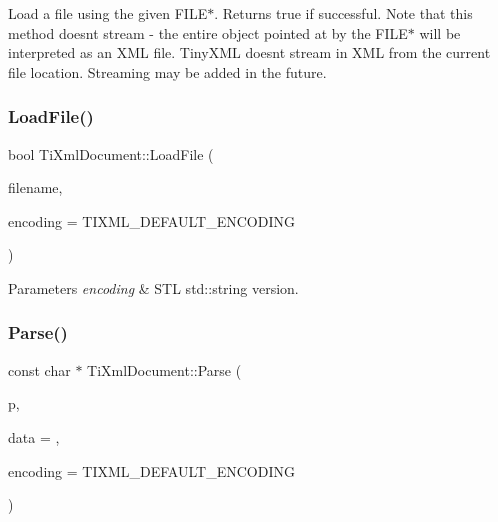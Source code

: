 Load a file using the given F\+I\+L\+E$\ast$. Returns true if successful. Note that this method doesn\textquotesingle{}t stream -\/ the entire object pointed at by the F\+I\+L\+E$\ast$ will be interpreted as an X\+ML file. Tiny\+X\+ML doesn\textquotesingle{}t stream in X\+ML from the current file location. Streaming may be added in the future. \hypertarget{class_ti_xml_document_a18ae6ed34fed7991ebc220862dfac884}{}\label{class_ti_xml_document_a18ae6ed34fed7991ebc220862dfac884} 
\subsubsection{\texorpdfstring{Load\+File()}{LoadFile()}\hspace{0.1cm}{\footnotesize\ttfamily [3/3]}}
{\footnotesize\ttfamily bool Ti\+Xml\+Document\+::\+Load\+File (\begin{DoxyParamCaption}\item[{const std\+::string \&}]{filename,  }\item[{Ti\+Xml\+Encoding}]{encoding = {\ttfamily TIXML\+\_\+DEFAULT\+\_\+ENCODING} }\end{DoxyParamCaption})\hspace{0.3cm}{\ttfamily [inline]}}


\begin{DoxyParams}{Parameters}
{\em encoding} & S\+TL std\+::string version. \\
\hline
\end{DoxyParams}
\hypertarget{class_ti_xml_document_a789ad2f06f93d52bdb5570b2f3670289}{}\label{class_ti_xml_document_a789ad2f06f93d52bdb5570b2f3670289} 
\subsubsection{\texorpdfstring{Parse()}{Parse()}}
{\footnotesize\ttfamily const char $\ast$ Ti\+Xml\+Document\+::\+Parse (\begin{DoxyParamCaption}\item[{const char $\ast$}]{p,  }\item[{\hyperlink{class_ti_xml_parsing_data}{Ti\+Xml\+Parsing\+Data} $\ast$}]{data = {},  }\item[{Ti\+Xml\+Encoding}]{encoding = {\ttfamily TIXML\+\_\+DEFAULT\+\_\+ENCODING} }\end{DoxyParamCaption})\hspace{0.3cm}{\ttfamily [virtual]}}

